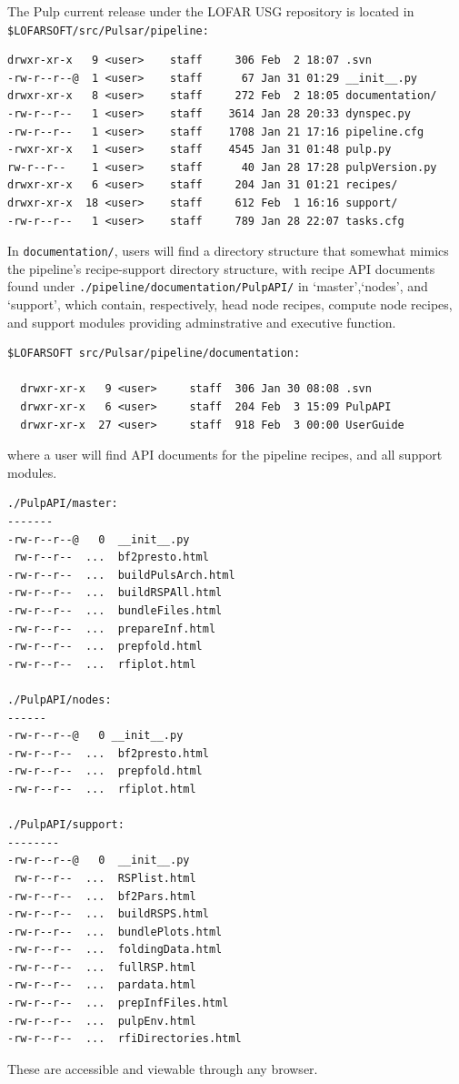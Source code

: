 \documentclass[a4paper,10pt,bibtotoc]{scrartcl}
\begin{document}
The Pulp current release under the LOFAR USG repository is located in \\
\noindent \verb|$LOFARSOFT/src/Pulsar/pipeline:|
\begin{verbatim}
drwxr-xr-x   9 <user>    staff     306 Feb  2 18:07 .svn 
-rw-r--r--@  1 <user>    staff      67 Jan 31 01:29 __init__.py
drwxr-xr-x   8 <user>    staff     272 Feb  2 18:05 documentation/
-rw-r--r--   1 <user>    staff    3614 Jan 28 20:33 dynspec.py
-rw-r--r--   1 <user>    staff    1708 Jan 21 17:16 pipeline.cfg
-rwxr-xr-x   1 <user>    staff    4545 Jan 31 01:48 pulp.py
rw-r--r--    1 <user>    staff      40 Jan 28 17:28 pulpVersion.py
drwxr-xr-x   6 <user>    staff     204 Jan 31 01:21 recipes/
drwxr-xr-x  18 <user>    staff     612 Feb  1 16:16 support/
-rw-r--r--   1 <user>    staff     789 Jan 28 22:07 tasks.cfg
\end{verbatim}
In \verb|documentation/|, users will  find a directory structure that
somewhat mimics the pipeline's recipe-support directory structure, with
recipe API documents found under
\verb|./pipeline/documentation/PulpAPI/| in
`master',`nodes', and `support', which contain, respectively, head
node recipes, compute node recipes, and support modules providing adminstrative and
executive function.
\begin{verbatim}
$LOFARSOFT src/Pulsar/pipeline/documentation:

  drwxr-xr-x   9 <user>     staff  306 Jan 30 08:08 .svn
  drwxr-xr-x   6 <user>     staff  204 Feb  3 15:09 PulpAPI
  drwxr-xr-x  27 <user>     staff  918 Feb  3 00:00 UserGuide
\end{verbatim}
where a user will find API documents for the pipeline recipes, and all support
modules.\\
\begin{verbatim}
./PulpAPI/master:
-------
-rw-r--r--@   0  __init__.py
 rw-r--r--  ...  bf2presto.html
-rw-r--r--  ...  buildPulsArch.html
-rw-r--r--  ...  buildRSPAll.html
-rw-r--r--  ...  bundleFiles.html
-rw-r--r--  ...  prepareInf.html
-rw-r--r--  ...  prepfold.html
-rw-r--r--  ...  rfiplot.html

./PulpAPI/nodes:
------
-rw-r--r--@   0 __init__.py
-rw-r--r--  ...  bf2presto.html
-rw-r--r--  ...  prepfold.html
-rw-r--r--  ...  rfiplot.html

./PulpAPI/support:
--------
-rw-r--r--@   0  __init__.py
 rw-r--r--  ...  RSPlist.html
-rw-r--r--  ...  bf2Pars.html
-rw-r--r--  ...  buildRSPS.html
-rw-r--r--  ...  bundlePlots.html
-rw-r--r--  ...  foldingData.html
-rw-r--r--  ...  fullRSP.html
-rw-r--r--  ...  pardata.html
-rw-r--r--  ...  prepInfFiles.html
-rw-r--r--  ...  pulpEnv.html
-rw-r--r--  ...  rfiDirectories.html
\end{verbatim}
These are accessible and viewable through any browser.
\end{document}
